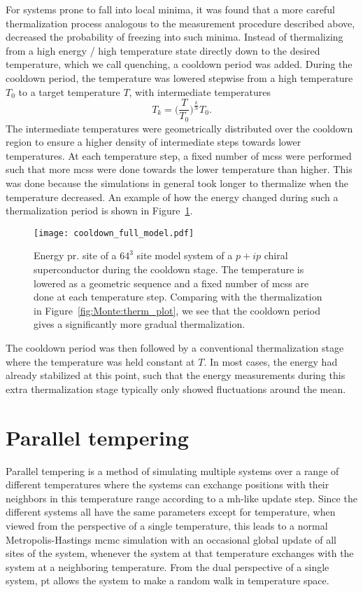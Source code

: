 For systems prone to fall into local minima, it was found that a more careful thermalization process analogous to the measurement procedure 
described above, decreased the probability of freezing into such minima. Instead of thermalizing from a high energy / high temperature state
directly down to the desired temperature, which we call quenching, a cooldown period was added. During the cooldown period, the temperature was
lowered stepwise from a high temperature $T_0$ to a target temperature $T$, with intermediate temperatures
\begin{equation}
    \label{eq:Monte:Therm:geometricTemperatures}
    T_k = \Big(\frac{T}{T_0}\Big)^{\frac{k}{N}}T_0.
\end{equation}
The intermediate temperatures were geometrically distributed over the cooldown region to ensure a higher density of intermediate steps towards lower temperatures. At
each temperature step, a fixed number of \ac{mcs}s were performed such that more \ac{mcs}s were done towards the lower temperature than
higher. This was done because the simulations in general took longer to thermalize when the temperature decreased. An example of how the
energy changed during such a thermalization period is shown in Figure~\ref{fig:Monte:cooldown_plot}.

\begin{figure}[t]
    \centering
    \texttt{[image: cooldown\_full\_model.pdf]}
    \caption{Energy pr. site of a $64^3$ site model system of a $p+ip$ chiral superconductor during the cooldown stage. The temperature is
    lowered as a geometric sequence and a fixed number of \ac{mcs}s are done at each temperature step. Comparing with the thermalization
    in Figure~\ref{fig:Monte:therm_plot}, we see that the cooldown period gives a significantly more gradual thermalization.}
    \label{fig:Monte:cooldown_plot}
\end{figure}

The cooldown period was then followed by a conventional thermalization stage where the temperature was held constant at $T$. In
most cases, the energy had already stabilized at this point, such that the energy measurements during this extra thermalization
stage typically only showed fluctuations around the mean.


\section{Parallel tempering}

Parallel tempering is a method of simulating multiple systems over a range of different temperatures where the systems can exchange
positions with their neighbors in this temperature range according to a \ac{mh}-like update step. Since the different systems all have the same parameters
except for temperature, when viewed from the perspective of a single temperature, this leads to a normal Metropolis-Hastings \ac{mcmc}
simulation with an occasional global update of all sites of the system, whenever the system at that temperature exchanges with the system at a neighboring
temperature. From the dual perspective of a single system, \ac{pt} allows the system to make a random walk in temperature space.


